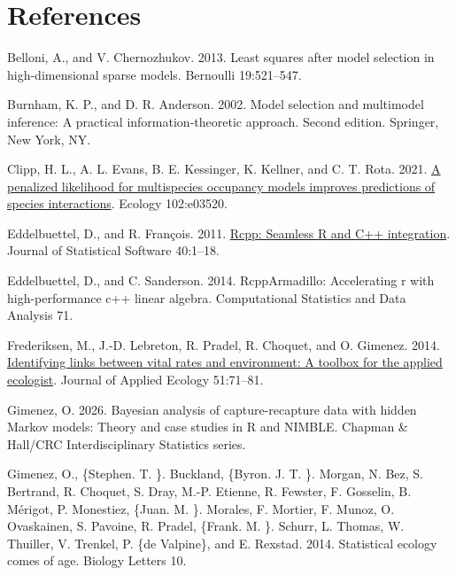 \documentclass[
  11pt,
  a4paper,
]{article}
\newlength{\cslhangindent}
\newenvironment{CSLReferences}[2] %
 {\begin{list}{}{%
  \setlength{\itemindent}{0pt}
  \setlength{\leftmargin}{0pt}
  \setlength{\parsep}{0pt}
  \ifodd #1
   \setlength{\leftmargin}{\cslhangindent}
   \setlength{\itemindent}{-1\cslhangindent}
  \fi
  \setlength{\itemsep}{#2\baselineskip}}}
 {\end{list}}
\begin{document}
\section{References}\label{references}

\protect{}\label{refs}
\begin{CSLReferences}{1}{0}
Belloni, A., and V. Chernozhukov. 2013. Least squares after model selection in high-dimensional sparse models. Bernoulli 19:521--547.

Burnham, K. P., and D. R. Anderson. 2002. Model selection and multimodel inference: A practical information-theoretic approach. Second edition. Springer, New York, NY.

Clipp, H. L., A. L. Evans, B. E. Kessinger, K. Kellner, and C. T. Rota. 2021. \href{https://doi.org/10.1002/ecy.3520}{A penalized likelihood for multispecies occupancy models improves predictions of species interactions}. Ecology 102:e03520.

Eddelbuettel, D., and R. François. 2011. \href{https://doi.org/10.18637/jss.v040.i08}{{Rcpp}: Seamless {R} and {C++} integration}. Journal of Statistical Software 40:1--18.

Eddelbuettel, D., and C. Sanderson. 2014. RcppArmadillo: Accelerating r with high-performance c++ linear algebra. Computational Statistics and Data Analysis 71.

Frederiksen, M., J.-D. Lebreton, R. Pradel, R. Choquet, and O. Gimenez. 2014. \href{https://doi.org/10.1111/1365-2664.12172}{Identifying links between vital rates and environment: A toolbox for the applied ecologist}. Journal of Applied Ecology 51:71--81.

Gimenez, O. 2026. Bayesian analysis of capture-recapture data with hidden {Markov} models: {Theory} and case studies in {R} and {NIMBLE}. Chapman \& Hall/CRC Interdisciplinary Statistics series.

Gimenez, O., \{Stephen. T. \}. Buckland, \{Byron. J. T. \}. Morgan, N. Bez, S. Bertrand, R. Choquet, S. Dray, M.-P. Etienne, R. Fewster, F. Gosselin, B. Mérigot, P. Monestiez, \{Juan. M. \}. Morales, F. Mortier, F. Munoz, O. Ovaskainen, S. Pavoine, R. Pradel, \{Frank. M. \}. Schurr, L. Thomas, W. Thuiller, V. Trenkel, P. \{de Valpine\}, and E. Rexstad. 2014. Statistical ecology comes of age. Biology Letters 10.


\end{CSLReferences}
\end{document}
